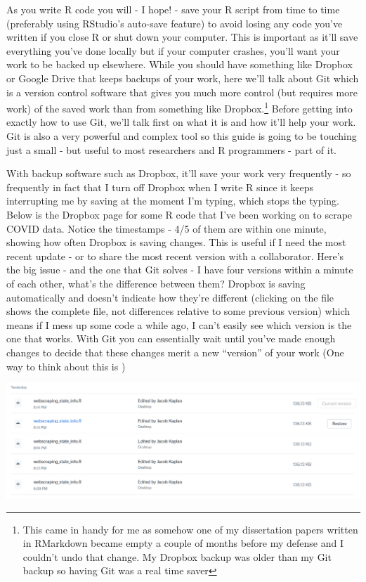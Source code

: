 \documentclass[
  12pt,
]{book}
\begin{document}
As you write R code you will - I hope! - save your R script from time to time (preferably using RStudio's auto-save feature) to avoid losing any code you've written if you close R or shut down your computer. This is important as it'll save everything you've done locally but if your computer crashes, you'll want your work to be backed up elsewhere. While you should have something like Dropbox or Google Drive that keeps backups of your work, here we'll talk about Git which is a version control software that gives you much more control (but requires more work) of the saved work than from something like Dropbox.\footnote{This came in handy for me as somehow one of my dissertation papers written in RMarkdown became empty a couple of months before my defense and I couldn't undo that change. My Dropbox backup was older than my Git backup so having Git was a real time saver} Before getting into exactly how to use Git, we'll talk first on what it is and how it'll help your work. Git is also a very powerful and complex tool so this guide is going to be touching just a small - but useful to most researchers and R programmers - part of it.

With backup software such as Dropbox, it'll save your work very frequently - so frequently in fact that I turn off Dropbox when I write R since it keeps interrupting me by saving at the moment I'm typing, which stops the typing. Below is the Dropbox page for some R code that I've been working on to scrape COVID data. Notice the timestamps - 4/5 of them are within one minute, showing how often Dropbox is saving changes. This is useful if I need the most recent update - or to share the most recent version with a collaborator. Here's the big issue - and the one that Git solves - I have four versions within a minute of each other, what's the difference between them? Dropbox is saving automatically and doesn't indicate how they're different (clicking on the file shows the complete file, not differences relative to some previous version) which means if I mess up some code a while ago, I can't easily see which version is the one that works. With Git you can essentially wait until you've made enough changes to decide that these changes merit a new ``version'' of your work (One way to think about this is )

\includegraphics{images/dropbox.png}
\end{document}
